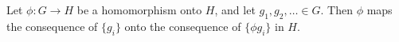 Let $\phi: G \to H$ be a homomorphism onto $H$, and let $g_1, g_2, \ldots \in G$. Then $\phi$ maps the consequence of $\{g_i\}$ onto the consequence of $\{\phi g_i\}$ in $H$.
